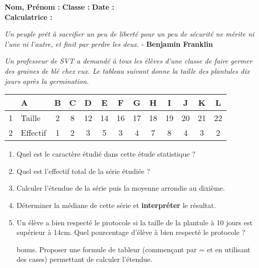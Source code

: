 \documentclass[12pt]{article}
\begin{document}

\textbf{Nom, Prénom :} \hspace{8cm} \textbf{Classe :} \hspace{3cm} \textbf{Date :}\\
\textbf{Calculatrice :}

\begin{center}
  \textit{Un peuple prêt à sacrifier un peu de liberté pour un peu de sécurité ne mérite ni l'une ni l'autre, et finit par perdre les deux.} - \textbf{Benjamin Franklin}
\end{center}



\setlength{\columnseprule}{1pt}


\textit{Un professeur de SVT a demandé à tous les élèves d'une classe de faire germer des graines de blé chez eux. Le tableau suivant donne la taille des plantules dix jours après la germination.}

\begin{center}
  \begin{tabular}{| l || l | c | c | c  | c  | c  | c  | c  | c  | c  | c  | c |}
    \hline
    &        A & B & C &  D &  E &  F &  G &  H &  I &  J &  K & L \\ 
    \hline
    1 &   Taille & 2 & 8 & 12 & 14 & 16 & 17 & 18 & 19 & 20 & 21 & 22 \\
    \hline 
    2 & Effectif & 1 & 2 &  3 &  5 &  3 &  4 &  7 &  8 &  4 &  3 &  2 \\
    \hline
  \end{tabular}
\end{center}

\begin{enumerate}
\item Quel est le caractère étudié dans cette étude statistique ?
\item Quel est l'effectif total de la série étudiée ?
\item Calculer l'étendue de la série puis la moyenne arrondie au dixième.
\item Déterminer la médiane de cette série et \textbf{interpréter} le résultat.
\item Un élève a bien respecté le protocole si la taille de la plantule à 10 jours est supérieur à 14cm. Quel pourcentage d'élève à bien respecté le protocole ?

\item[bonus.] Proposer une formule de tableur (commençant par = et en utilisant des cases) permettant de calculer l'étendue.
\end{enumerate}
\end{document}

